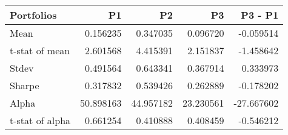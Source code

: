 \begin{tabular}{lrrrr}
\toprule
Portfolios & P1 & P2 & P3 & P3 - P1 \\
\midrule
Mean & 0.156235 & 0.347035 & 0.096720 & -0.059514 \\
t-stat of mean & 2.601568 & 4.415391 & 2.151837 & -1.458642 \\
Stdev & 0.491564 & 0.643341 & 0.367914 & 0.333973 \\
Sharpe & 0.317832 & 0.539426 & 0.262889 & -0.178202 \\
Alpha & 50.898163 & 44.957182 & 23.230561 & -27.667602 \\
t-stat of alpha & 0.661254 & 0.410888 & 0.408459 & -0.546212 \\
\bottomrule
\end{tabular}
